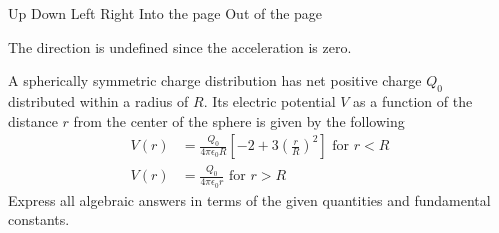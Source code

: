 \documentclass{../../oss-classkick-exam}
\begin{document}
\begin{questions}
\begin{parts}
    \vspace{.1in}
    \underline{\hspace{.3in}} Up\hspace{.2in}
    \underline{\hspace{.3in}} Down\hspace{.2in}
    \underline{\hspace{.3in}} Left\hspace{.2in}
    \underline{\hspace{.3in}} Right\hspace{.2in}
    \underline{\hspace{.3in}} Into the page\hspace{.2in}
    \underline{\hspace{.3in}} Out of the page

    \vspace{.1in}\underline{\hspace{.3in}} The direction is undefined since the
    acceleration is zero.
  \end{parts}
  \newpage
  
  \question A spherically symmetric charge distribution has net positive charge
  $Q_0$ distributed within a radius of $R$. Its electric potential $V$ as a
  function of the distance $r$ from the center of the sphere is given by the
  following
  \begin{align*}
    V(r) &= \frac{Q_0}{4\pi\epsilon_0R}\left[-2+3\left(\frac rR\right)^2 \right]
    \text{ for } r<R\\
    V(r) &= \frac{Q_0}{4\pi\epsilon_0r}\text{ for } r>R
  \end{align*}
  Express all algebraic answers in terms of the given quantities and
  fundamental constants.
\end{questions}
\end{document}
